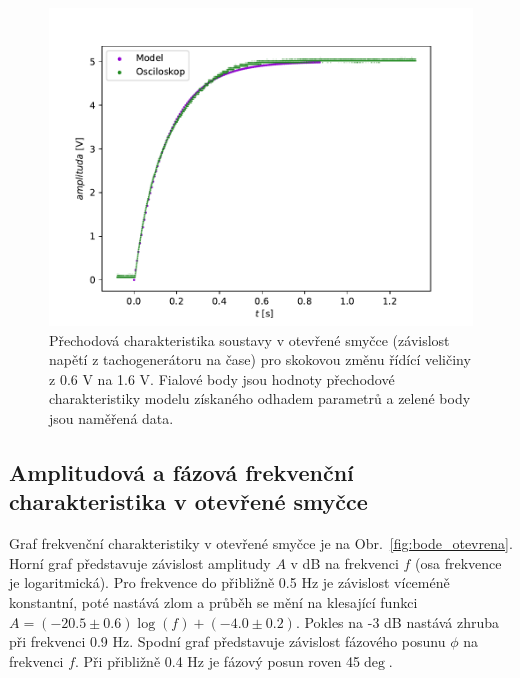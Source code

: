 		\begin{figure}[!hbt]
			\centering
			\includegraphics[]{img/graf_prechodova.pdf} 
			\caption{Přechodová charakteristika soustavy v otevřené smyčce (závislost napětí z tachogenerátoru na čase) 
			pro skokovou změnu řídící veličiny z 0.6 V na 1.6 V. 
			Fialové body jsou hodnoty přechodové charakteristiky modelu získaného odhadem parametrů a zelené body jsou naměřená data.} 
			\label{fig:prechodova} 
		\end{figure}

	\subsection{Amplitudová a fázová frekvenční charakteristika v otevřené smyčce}
		Graf frekvenční charakteristiky v otevřené smyčce je na Obr.~\ref{fig:bode_otevrena}. Horní graf představuje závislost amplitudy $A$ v dB na frekvenci $f$ (osa frekvence je logaritmická). Pro frekvence do přibližně 0.5 Hz je závislost víceméně konstantní, poté nastává zlom a průběh se mění na klesající funkci $A=(-20.5\pm 0.6)\log(f)+(-4.0\pm 0.2)$. Pokles na -3 dB nastává zhruba při frekvenci 0.9 Hz. Spodní graf představuje závislost fázového posunu $\phi$ na frekvenci $f$. Při přibližně 0.4 Hz je fázový posun roven 45$\deg$.

